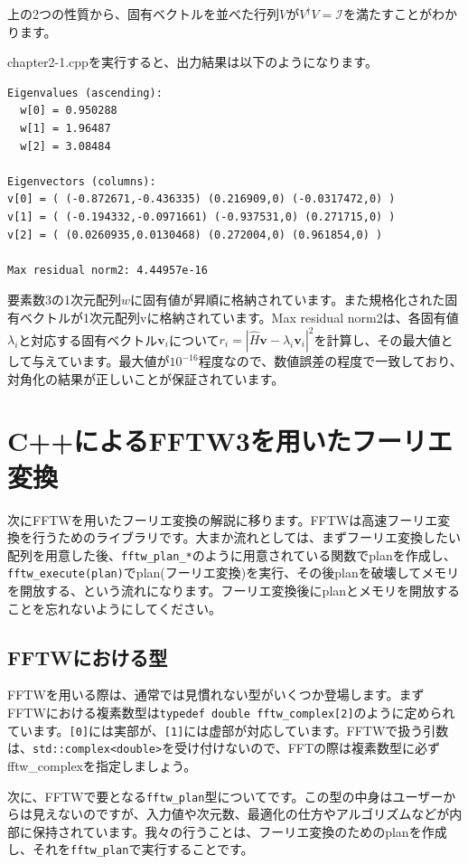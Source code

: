 \documentclass[12pt]{jreport}
\begin{document}
上の2つの性質から、固有ベクトルを並べた行列$V$が$V^{\dagger}V = \mathcal{I}$を満たすことがわかります。

chapter2-1.cppを実行すると、出力結果は以下のようになります。
\begin{lstlisting}[style=terminal]
Eigenvalues (ascending):
  w[0] = 0.950288
  w[1] = 1.96487
  w[2] = 3.08484

Eigenvectors (columns):
v[0] = ( (-0.872671,-0.436335) (0.216909,0) (-0.0317472,0) )
v[1] = ( (-0.194332,-0.0971661) (-0.937531,0) (0.271715,0) )
v[2] = ( (0.0260935,0.0130468) (0.272004,0) (0.961854,0) )

Max residual norm2: 4.44957e-16
\end{lstlisting}
要素数3の1次元配列$w$に固有値が昇順に格納されています。また規格化された固有ベクトルが1次元配列vに格納されています。Max residual norm2は、各固有値$\lambda_i$と対応する固有ベクトル$\mathbf{v}_i$について$r_i = |\hat{H}\mathbf{v} - \lambda_i \mathbf{v}_i|^2$を計算し、その最大値として与えています。最大値が$10^{-16}$程度なので、数値誤差の程度で一致しており、対角化の結果が正しいことが保証されています。

\section{C++によるFFTW3を用いたフーリエ変換}
次にFFTWを用いたフーリエ変換の解説に移ります。FFTWは高速フーリエ変換を行うためのライブラリです。大まか流れとしては、まずフーリエ変換したい配列を用意した後、\texttt{fftw_plan_*}のように用意されている関数でplanを作成し、\texttt{fftw_execute(plan)}でplan(フーリエ変換)を実行、その後planを破壊してメモリを開放する、という流れになります。フーリエ変換後にplanとメモリを開放することを忘れないようにしてください。

\subsection{FFTWにおける型}
FFTWを用いる際は、通常では見慣れない型がいくつか登場します。まずFFTWにおける複素数型は\texttt{typedef double fftw_complex[2]}のように定められています。\texttt{[0]}には実部が、\texttt{[1]}には虚部が対応しています。FFTWで扱う引数は、\texttt{std::complex<double>}を受け付けないので、FFTの際は複素数型に必ずfftw_complexを指定しましょう。

次に、FFTWで要となる\texttt{fftw_plan}型についてです。この型の中身はユーザーからは見えないのですが、入力値や次元数、最適化の仕方やアルゴリズムなどが内部に保持されています。我々の行うことは、フーリエ変換のためのplanを作成し、それを\texttt{fftw_plan}で実行することです。
\end{document}
